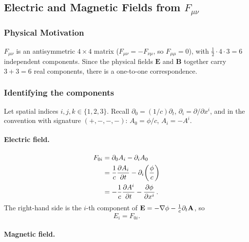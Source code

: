 \subsection{Electric and Magnetic Fields from $F_{\mu\nu}$}\label{subsec:F-components}

\subsubsection*{Physical Motivation}
$F_{\mu\nu}$ is an antisymmetric $4\times 4$ matrix ($F_{\mu\nu} = -F_{\nu\mu}$, so $F_{\mu\mu} = 0$), with $\tfrac{1}{2}\cdot 4\cdot 3 = 6$ independent components.  Since the physical fields $\mathbf{E}$ and $\mathbf{B}$ together carry $3 + 3 = 6$ real components, there is a one-to-one correspondence.

\subsubsection*{Identifying the components}

Let spatial indices $i,j,k \in \{1,2,3\}$.  Recall $\partial_0 = (1/c)\partial_t$, $\partial_i = \partial/\partial x^i$, and in the convention with signature $(+,-,-,-)$: $A_0 = \phi/c$, $A_i = -A^i$.

\paragraph{Electric field.}

\begin{align}
  F_{0i} &= \partial_0 A_i - \partial_i A_0 \notag\\
  &= \frac{1}{c}\frac{\partial A_i}{\partial t} - \partial_i\!\left(\frac{\phi}{c}\right) \notag\\
  &= -\frac{1}{c}\frac{\partial A^i}{\partial t} - \frac{\partial\phi}{\partial x^i} \,.
\end{align}
The right-hand side is the $i$-th component of $\mathbf{E} = -\nabla\phi - \frac{1}{c}\partial_t\mathbf{A}$, so
\begin{equation}\label{eq:E-from-F}
  \boxed{E_i = F_{0i}.}
\end{equation}

\paragraph{Magnetic field.}

